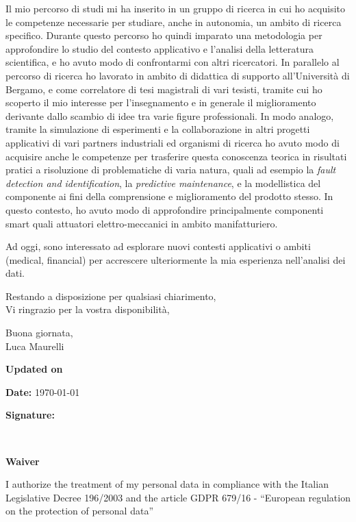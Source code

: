 \documentclass[10pt]{article}
\begin{document}
Il mio percorso di studi mi ha inserito in un gruppo di ricerca in cui ho acquisito le competenze necessarie per studiare, anche in autonomia, un ambito di ricerca specifico.
Durante questo percorso ho quindi imparato una metodologia per approfondire lo studio del contesto applicativo e l'analisi della letteratura scientifica, e ho avuto modo di confrontarmi con altri ricercatori.
In parallelo al percorso di ricerca ho lavorato in ambito di didattica di supporto all'Università di Bergamo, e come correlatore di tesi magistrali di vari tesisti, tramite cui ho scoperto il mio interesse per l'insegnamento e in generale il miglioramento derivante dallo scambio di idee tra varie figure professionali.
In modo analogo, tramite la simulazione di esperimenti e la collaborazione in altri progetti applicativi di vari partners industriali ed organismi di ricerca ho avuto modo di acquisire anche le competenze per trasferire questa conoscenza teorica in risultati pratici a risoluzione di problematiche di varia natura, quali ad esempio la \textit{fault detection and identification}, la \textit{predictive maintenance}, e la modellistica del componente ai fini della comprensione e miglioramento del prodotto stesso.
In questo contesto, ho avuto modo di approfondire principalmente componenti smart quali attuatori elettro-meccanici in ambito manifatturiero.

Ad oggi, sono interessato ad esplorare nuovi contesti applicativi o ambiti (medical, financial) per accrescere ulteriormente la mia esperienza nell'analisi dei dati.

Restando a disposizione per qualsiasi chiarimento,\\
Vi ringrazio per la vostra disponibilità,

Buona giornata,\\
Luca Maurelli
\vfill
{\centering \textbf{Updated on} \par}
\begin{minipage}[t]{.49\textwidth}
	\raggedright
	{\textbf{Date:} \textsc{\today}\par}
\end{minipage}%
\hfill
\begin{minipage}[t]{.49\textwidth}
	\raggedleft
	{\textbf{Signature:}\hspace{5cm} \par}
\end{minipage}
\vspace{3cm}\\
{\centering \textbf{Waiver} \par}
{\small I authorize the treatment of my personal data in compliance with the Italian Legislative Decree 196/2003 and the article GDPR 679/16 - “European regulation on the protection of personal data”}
\end{document}
